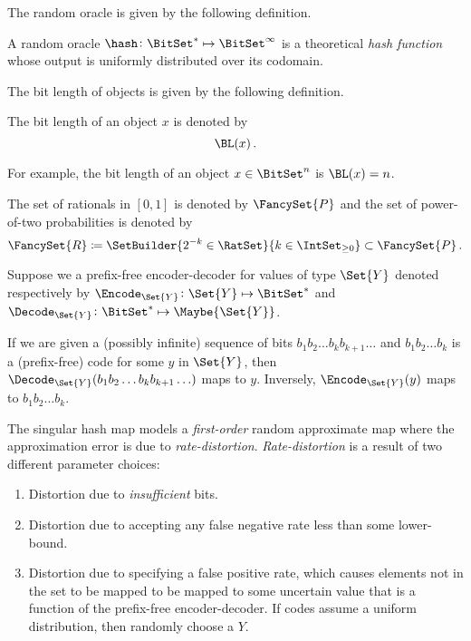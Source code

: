 \documentclass[ ../main.tex]{subfiles}
\begin{document}
The random oracle is given by the following definition.
\begin{definition}
\label{def:randomoracle}
A random oracle $\hash \colon \BitSet^* \mapsto \BitSet^{\infty}$ is a theoretical \emph{hash function} whose output is uniformly distributed over its codomain.
\end{definition}

The bit length of objects is given by the following definition.
\begin{definition}
The bit length of an object $x$ is denoted by
\begin{equation}
    \BL(x)\,.
\end{equation}
\end{definition}
For example, the bit length of an object $x \in \BitSet^n$ is $\BL(x) = n$.

The set of rationals in $[0,1]$ is denoted by $\FancySet{P}$ and the set of power-of-two probabilities is denoted by
\begin{equation}
	\FancySet{R} \coloneqq \SetBuilder{2^{-k} \in \RatSet}{k \in \IntSet_{\geq 0}} \subset \FancySet{P}\,.
\end{equation}



Suppose we a prefix-free encoder-decoder for values of type $\Set{Y}$ denoted respectively by $\Encode_{\Set{Y}} \colon \Set{Y} \mapsto \BitSet^*$ and $\Decode_{\Set{Y}} \colon \BitSet^* \mapsto \Maybe{\Set{Y}}$.

If we are given a (possibly infinite) sequence of bits $b_1 b_2 \ldots b_k b_{k+1} \ldots$ and $b_1 b_2 \ldots b_k$ is a (prefix-free) code for some $y$ in $\Set{Y}$, then $\Decode_{\Set{Y}}(b_1 b_2 \ldots b_k b_{k+1} \ldots)$ maps to $y$.
Inversely, $\Encode_{\Set{Y}}(y)$ maps to $b_1 b_2 \ldots b_k$.

The singular hash map models a \emph{first-order} random approximate map where the approximation error is due to \emph{rate-distortion}.
\emph{Rate-distortion} is a result of two different parameter choices:
\begin{enumerate}
	\item\label{itm1} Distortion due to \emph{insufficient} bits.
	\item\label{itm1} Distortion due to accepting any false negative rate less than some lower-bound.
	\item Distortion due to specifying a false positive rate, which causes elements not in the set to be mapped to be mapped to some uncertain value that is a function of the prefix-free encoder-decoder. If codes assume a uniform distribution, then randomly choose a $Y$.
\end{enumerate}
\end{document}
